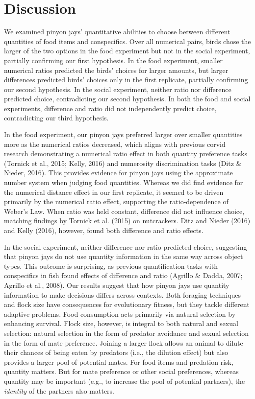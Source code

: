 \documentclass[
  ,pub,floatsintext]{apa6}
\begin{document}
\hypertarget{discussion}{%
\section{Discussion}\label{discussion}}

We examined pinyon jays' quantitative abilities to choose between different quantities of food items and conspecifics. Over all numerical pairs, birds chose the larger of the two options in the food experiment but not in the social experiment, partially confirming our first hypothesis. In the food experiment, smaller numerical ratios predicted the birds' choices for larger amounts, but larger differences predicted birds' choices only in the first replicate, partially confirming our second hypothesis. In the social experiment, neither ratio nor difference predicted choice, contradicting our second hypothesis. In both the food and social experiments, difference and ratio did not independently predict choice, contradicting our third hypothesis.

In the food experiment, our pinyon jays preferred larger over smaller quantities more as the numerical ratios decreased, which aligns with previous corvid research demonstrating a numerical ratio effect in both quantity preference tasks (Tornick et al., 2015; Kelly, 2016) and numerosity discrimination tasks (Ditz \& Nieder, 2016). This provides evidence for pinyon jays using the approximate number system when judging food quantities. Whereas we did find evidence for the numerical distance effect in our first replicate, it seemed to be driven primarily by the numerical ratio effect, supporting the ratio-dependence of Weber's Law. When ratio was held constant, difference did not influence choice, matching findings by Tornick et al. (2015) on nutcrackers. Ditz and Nieder (2016) and Kelly (2016), however, found both difference and ratio effects.

In the social experiment, neither difference nor ratio predicted choice, suggesting that pinyon jays do not use quantity information in the same way across object types. This outcome is surprising, as previous quantification tasks with conspecifics in fish found effects of difference and ratio (Agrillo \& Dadda, 2007; Agrillo et al., 2008). Our results suggest that how pinyon jays use quantity information to make decisions differs across contexts. Both foraging techniques and flock size have consequences for evolutionary fitness, but they tackle different adaptive problems. Food consumption acts primarily via natural selection by enhancing survival. Flock size, however, is integral to both natural and sexual selection: natural selection in the form of predator avoidance and sexual selection in the form of mate preference. Joining a larger flock allows an animal to dilute their chances of being eaten by predators (i.e., the dilution effect) but also provides a larger pool of potential mates. For food items and predation risk, quantity matters. But for mate preference or other social preferences, whereas quantity may be important (e.g., to increase the pool of potential partners), the \emph{identity} of the partners also matters.
\end{document}
